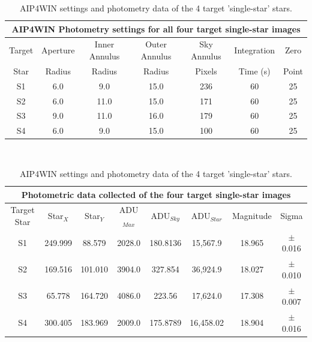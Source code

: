 \documentclass[12pt]{article}
\begin{document}
\begin{table}[H]
\begin{center}
 \footnotesize
 \begin{tabular}{|c||c|c|c||c||c|c|}
 \hline
 \multicolumn{7}{|c|}{AIP4WIN Photometry settings for all four target single-star images} \\
 \hline \hline
 Target & Aperture & Inner Annulus & Outer Annulus & Sky Annulus & Integration & Zero  \\
 Star & Radius & Radius & Radius & Pixels & Time (s) & Point \\
 \hline \hline
 S1 & 6.0 & 9.0 & 15.0 & 236 & 60 & 25 \\
 \hline
 S2 & 6.0 & 11.0 & 15.0 & 171 & 60 & 25 \\
 \hline
 S3 & 9.0 & 11.0 & 16.0 & 179 & 60 & 25 \\
 \hline
 S4 & 6.0 & 9.0 & 15.0 & 100 & 60 & 25  \\
 \hline
 \end{tabular} \\ [0.5cm]
 \begin{tabular}{|c||c|c||c|c|c||c|c|}
 \hline
 \multicolumn{8}{|c|}{Photometric data collected of the four target single-star images} \\
 \hline \hline
 Target Star & Star$_X$ & Star$_Y$ & ADU$_{Max}$ & ADU$_{Sky}$ & ADU$_{Star}$ & Magnitude & Sigma\\
 \hline \hline
 S1 & 249.999 & 88.579 & 2028.0 & 180.8136 & 15,567.9 & 18.965 & $\pm$0.016 \\
 \hline
 S2 & 169.516 & 101.010 & 3904.0 & 327.854 & 36,924.9 & 18.027 & $\pm$0.010 \\
 \hline
 S3 & 65.778 & 164.720 & 4086.0 & 223.56 & 17,624.0 & 17.308 & $\pm$0.007 \\
 \hline
 S4 & 300.405 & 183.969 & 2009.0 & 175.8789 & 16,458.02 & 18.904 & $\pm$0.016 \\
 \hline
 \end{tabular} \\ 
 \caption{AIP4WIN settings and photometry data of the 4 target 'single-star' stars.}
 \label{SS Data}
\end{center}
\end{table} 
\end{document}
